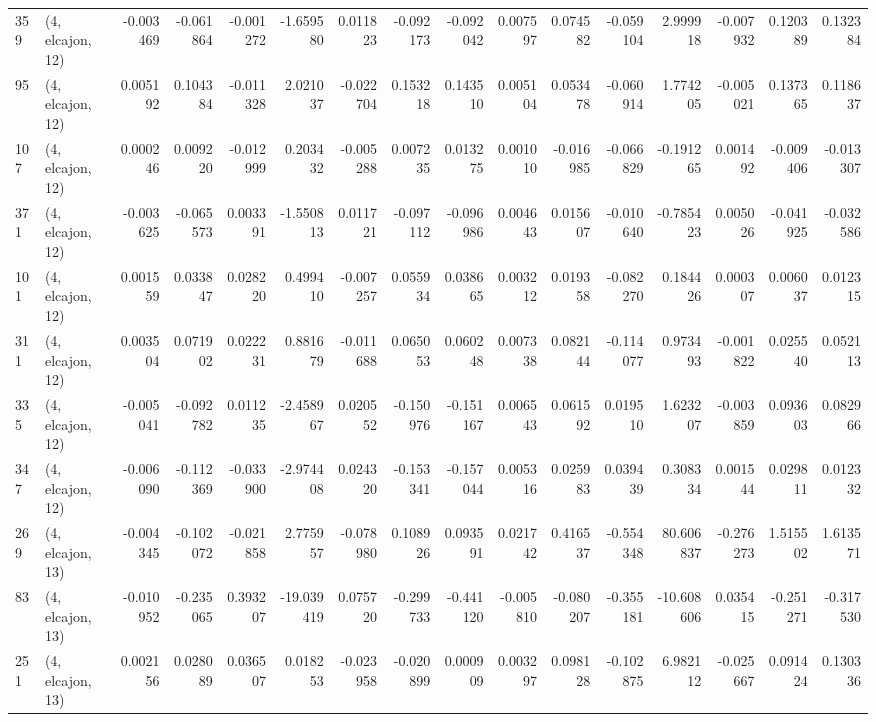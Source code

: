 \begin{tabular}{llrrrrrrrrrrrrrr}
359 &  (4, elcajon, 12) &  -0.003469 & -0.061864 & -0.001272 &  -1.659580 &  0.011823 &  -0.092173 & -0.092042 &  0.007597 &  0.074582 & -0.059104 &     2.999918 &  -0.007932 &   0.120389 &   0.132384 \\
95  &  (4, elcajon, 12) &   0.005192 &  0.104384 & -0.011328 &   2.021037 & -0.022704 &   0.153218 &  0.143510 &  0.005104 &  0.053478 & -0.060914 &     1.774205 &  -0.005021 &   0.137365 &   0.118637 \\
107 &  (4, elcajon, 12) &   0.000246 &  0.009220 & -0.012999 &   0.203432 & -0.005288 &   0.007235 &  0.013275 &  0.001010 & -0.016985 & -0.066829 &    -0.191265 &   0.001492 &  -0.009406 &  -0.013307 \\
371 &  (4, elcajon, 12) &  -0.003625 & -0.065573 &  0.003391 &  -1.550813 &  0.011721 &  -0.097112 & -0.096986 &  0.004643 &  0.015607 & -0.010640 &    -0.785423 &   0.005026 &  -0.041925 &  -0.032586 \\
101 &  (4, elcajon, 12) &   0.001559 &  0.033847 &  0.028220 &   0.499410 & -0.007257 &   0.055934 &  0.038665 &  0.003212 &  0.019358 & -0.082270 &     0.184426 &   0.000307 &   0.006037 &   0.012315 \\
311 &  (4, elcajon, 12) &   0.003504 &  0.071902 &  0.022231 &   0.881679 & -0.011688 &   0.065053 &  0.060248 &  0.007338 &  0.082144 & -0.114077 &     0.973493 &  -0.001822 &   0.025540 &   0.052113 \\
335 &  (4, elcajon, 12) &  -0.005041 & -0.092782 &  0.011235 &  -2.458967 &  0.020552 &  -0.150976 & -0.151167 &  0.006543 &  0.061592 &  0.019510 &     1.623207 &  -0.003859 &   0.093603 &   0.082966 \\
347 &  (4, elcajon, 12) &  -0.006090 & -0.112369 & -0.033900 &  -2.974408 &  0.024320 &  -0.153341 & -0.157044 &  0.005316 &  0.025983 &  0.039439 &     0.308334 &   0.001544 &   0.029811 &   0.012332 \\
269 &  (4, elcajon, 13) &  -0.004345 & -0.102072 & -0.021858 &   2.775957 & -0.078980 &   0.108926 &  0.093591 &  0.021742 &  0.416537 & -0.554348 &    80.606837 &  -0.276273 &   1.515502 &   1.613571 \\
83  &  (4, elcajon, 13) &  -0.010952 & -0.235065 &  0.393207 & -19.039419 &  0.075720 &  -0.299733 & -0.441120 & -0.005810 & -0.080207 & -0.355181 &   -10.608606 &   0.035415 &  -0.251271 &  -0.317530 \\
251 &  (4, elcajon, 13) &   0.002156 &  0.028089 &  0.036507 &   0.018253 & -0.023958 &  -0.020899 &  0.000909 &  0.003297 &  0.098128 & -0.102875 &     6.982112 &  -0.025667 &   0.091424 &   0.130336 \\

\end{tabular}
